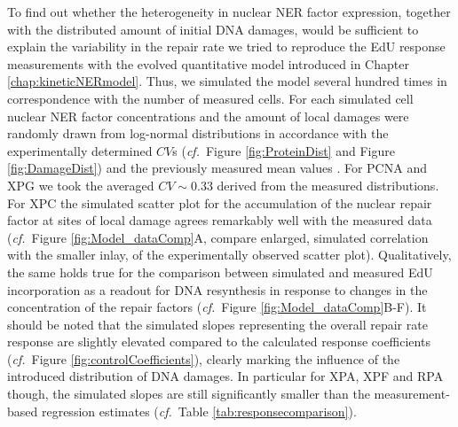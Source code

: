 To find out whether the heterogeneity in nuclear NER factor expression, together with the distributed amount of initial DNA damages, would be sufficient to explain the variability in the repair rate we tried to reproduce the EdU response measurements with the evolved quantitative model introduced in Chapter \ref{chap:kineticNERmodel}. Thus, we simulated the model several hundred times in correspondence with the number of measured cells. For each simulated cell nuclear NER factor concentrations and the amount of local damages were randomly drawn from log-normal distributions in accordance with the experimentally determined $CV$s (\textit{cf.}\ Figure \ref{fig:ProteinDist} and Figure \ref{fig:DamageDist}) and the previously measured mean values \cite{Luijsterburg2010}. For PCNA and XPG we took the averaged $CV\sim$0.33 derived from the measured distributions. \\
For XPC the simulated scatter plot for the accumulation of the nuclear repair factor at sites of local damage agrees remarkably well with the measured data (\textit{cf.}\ Figure \ref{fig:Model_dataComp}A, compare enlarged, simulated correlation with the smaller inlay, of the experimentally observed scatter plot). Qualitatively, the same holds true for the comparison between simulated and measured EdU incorporation as a readout for DNA resynthesis in response to changes in the concentration of the repair factors (\textit{cf.}\ Figure \ref{fig:Model_dataComp}B-F). It should be noted that the simulated slopes representing the overall repair rate response are slightly elevated compared to the calculated response coefficients (\textit{cf.}\ Figure \ref{fig:controlCoefficients}), clearly marking the influence of the introduced distribution of DNA damages. In particular for XPA, XPF and RPA though, the simulated slopes are still significantly smaller than the measurement-based regression estimates (\textit{cf.}\ Table \ref{tab:responsecomparison}). 
